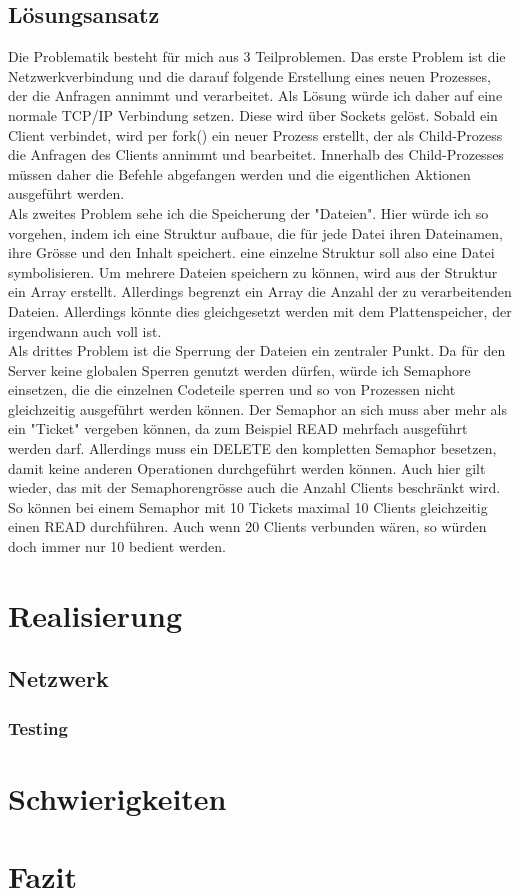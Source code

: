 \documentclass[12pt,a4paper,ngerman]{report}
\begin{document}
\section{Lösungsansatz}
Die Problematik besteht für mich aus 3 Teilproblemen. Das erste Problem ist die Netzwerkverbindung und die darauf folgende Erstellung eines neuen Prozesses, der die Anfragen annimmt und verarbeitet. Als Lösung würde ich daher auf eine normale TCP/IP Verbindung setzen. Diese wird über Sockets gelöst. Sobald ein Client verbindet, wird per fork() ein neuer Prozess erstellt, der als Child-Prozess die Anfragen des Clients annimmt und bearbeitet. Innerhalb des Child-Prozesses müssen daher die Befehle abgefangen werden und die eigentlichen Aktionen ausgeführt werden.
\\
Als zweites Problem sehe ich die Speicherung der "Dateien". Hier würde ich so vorgehen, indem ich eine Struktur aufbaue, die für jede Datei ihren Dateinamen, ihre Grösse und den Inhalt speichert. eine einzelne Struktur soll also eine Datei symbolisieren. Um mehrere Dateien speichern zu können, wird aus der Struktur ein Array erstellt. Allerdings begrenzt ein Array die Anzahl der zu verarbeitenden Dateien. Allerdings könnte dies gleichgesetzt werden mit dem Plattenspeicher, der irgendwann auch voll ist.
\\
Als drittes Problem ist die Sperrung der Dateien ein zentraler Punkt. Da für den Server keine globalen Sperren genutzt werden dürfen, würde ich Semaphore einsetzen, die die einzelnen Codeteile sperren und so von Prozessen nicht gleichzeitig ausgeführt werden können. Der Semaphor an sich muss aber mehr als ein "Ticket" vergeben können, da zum Beispiel READ mehrfach ausgeführt werden darf. Allerdings muss ein DELETE den kompletten Semaphor besetzen, damit keine anderen Operationen durchgeführt werden können.
Auch hier gilt wieder, das mit der Semaphorengrösse auch die Anzahl Clients beschränkt wird. So können bei einem Semaphor mit 10 Tickets maximal 10 Clients gleichzeitig einen READ durchführen. Auch wenn 20 Clients verbunden wären, so würden doch immer nur 10 bedient werden.
\chapter{Realisierung}
\section{Netzwerk}
\subsection{Testing}
\chapter{Schwierigkeiten}
\chapter{Fazit}
\end{document}

